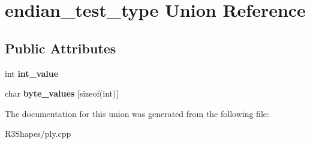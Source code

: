 \hypertarget{unionendian__test__type}{}\section{endian\+\_\+test\+\_\+type Union Reference}
\label{unionendian__test__type}
\subsection*{Public Attributes}
\begin{DoxyCompactItemize}
\item 
int {\bfseries int\+\_\+value}\hypertarget{unionendian__test__type_acc502f85824595f6dd7ef2c54781037f}{}\label{unionendian__test__type_acc502f85824595f6dd7ef2c54781037f}

\item 
char {\bfseries byte\+\_\+values} \mbox{[}sizeof(int)\mbox{]}\hypertarget{unionendian__test__type_a586ff697e5cd2a1daa7b13be58e01ca0}{}\label{unionendian__test__type_a586ff697e5cd2a1daa7b13be58e01ca0}

\end{DoxyCompactItemize}


The documentation for this union was generated from the following file\+:\begin{DoxyCompactItemize}
\item 
R3\+Shapes/ply.\+cpp\end{DoxyCompactItemize}
